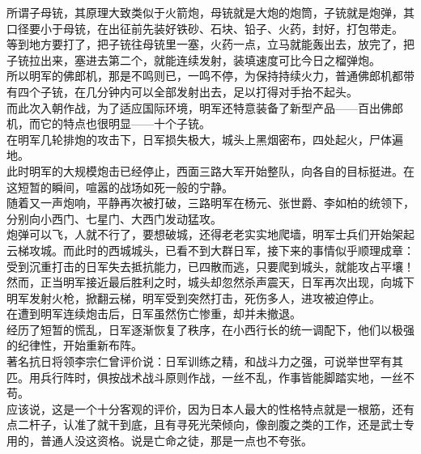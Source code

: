 \begin{multicols}{\theparacolNo}
所谓子母铳，其原理大致类似于火箭炮，母铳就是大炮的炮筒，子铳就是炮弹，其口径要小于母铳，在出征前先装好铁砂、石块、铅子、火药，封好，打包带走。\\

等到地方要打了，把子铳往母铳里一塞，火药一点，立马就能轰出去，放完了，把子铳拉出来，塞进去第二个，就能连续发射，装填速度可比今日之榴弹炮。\\

所以明军的佛郎机，那是不鸣则已，一鸣不停，为保持持续火力，普通佛郎机都带有四个子铳，在几分钟内可以全部发射出去，足以打得对手抬不起头。\\

而此次入朝作战，为了适应国际环境，明军还特意装备了新型产品——百出佛郎机，而它的特点也很明显——十个子铳。\\

在明军几轮排炮的攻击下，日军损失极大，城头上黑烟密布，四处起火，尸体遍地。\\

此时明军的大规模炮击已经停止，西面三路大军开始整队，向各自的目标挺进。在这短暂的瞬间，喧嚣的战场如死一般的宁静。\\

随着又一声炮响，平静再次被打破，三路明军在杨元、张世爵、李如柏的统领下，分别向小西门、七星门、大西门发动猛攻。\\

炮弹可以飞，人就不行了，要想破城，还得老老实实地爬墙，明军士兵们开始架起云梯攻城。而此时的西城城头，已看不到大群日军，接下来的事情似乎顺理成章：受到沉重打击的日军失去抵抗能力，已四散而逃，只要爬到城头，就能攻占平壤！\\

然而，正当明军接近最后胜利之时，城头却忽然杀声震天，日军再次出现，向城下明军发射火枪，掀翻云梯，明军受到突然打击，死伤多人，进攻被迫停止。\\

在遭到明军连续炮击后，日军虽然伤亡惨重，却并未撤退。\\

经历了短暂的慌乱，日军逐渐恢复了秩序，在小西行长的统一调配下，他们以极强的纪律性，开始重新布阵。\\

著名抗日将领李宗仁曾评价说：日军训练之精，和战斗力之强，可说举世罕有其匹。用兵行阵时，俱按战术战斗原则作战，一丝不乱，作事皆能脚踏实地，一丝不苟。\\

应该说，这是一个十分客观的评价，因为日本人最大的性格特点就是一根筋，还有点二杆子，认准了就干到底，且有寻死光荣倾向，像剖腹之类的工作，还是武士专用的，普通人没这资格。说是亡命之徒，那是一点也不夸张。\\


\end{multicols}
